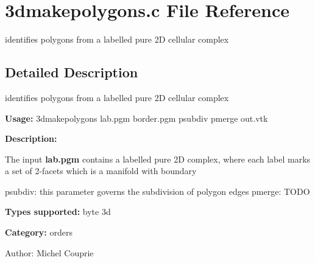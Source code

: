 \section{3dmakepolygons.c File Reference}
\label{3dmakepolygons_8c}
identifies polygons from a labelled pure 2D cellular complex 



\subsection{Detailed Description}
identifies polygons from a labelled pure 2D cellular complex 

{\bf Usage:} 3dmakepolygons lab.pgm border.pgm psubdiv pmerge out.vtk

{\bf Description:}

The input {\bf lab.pgm} contains a labelled pure 2D complex, where each label marks a set of 2-facets which is a manifold with boundary

psubdiv: this parameter governs the subdivision of polygon edges pmerge: TODO

{\bf Types supported:} byte 3d

{\bf Category:} orders

\begin{Desc}
\item[Author:]Michel Couprie \end{Desc}
